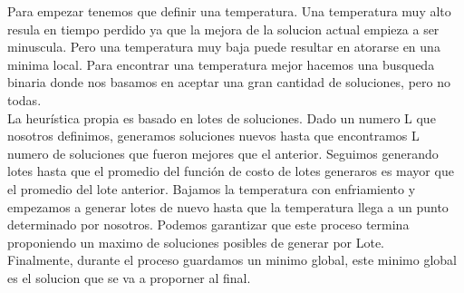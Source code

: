 \documentclass{article}
\begin{document}
    Para empezar tenemos que definir una temperatura. Una temperatura muy alto resula en tiempo perdido
    ya que la mejora de la solucion actual empieza a ser minuscula. Pero una temperatura muy baja puede resultar
    en atorarse en una minima local. Para encontrar una temperatura mejor hacemos una busqueda binaria donde
    nos basamos en aceptar una gran cantidad de soluciones, pero no todas. \\
    
    La heurística propia es basado en lotes de soluciones. Dado un numero L que nosotros definimos, generamos
    soluciones nuevos hasta que encontramos L numero de soluciones que fueron mejores que el anterior. Seguimos
    generando lotes hasta que el promedio del función de costo de lotes generaros es mayor que el promedio
    del lote anterior. Bajamos la temperatura con enfriamiento y empezamos a generar lotes de nuevo hasta
    que la temperatura llega a un punto determinado por nosotros. Podemos garantizar que este proceso termina
    proponiendo un maximo de soluciones posibles de generar por Lote. \\
    
    
    Finalmente, durante el proceso guardamos un minimo global, este minimo global es el solucion que se va a
    proporner al final.
    
\end{document}
